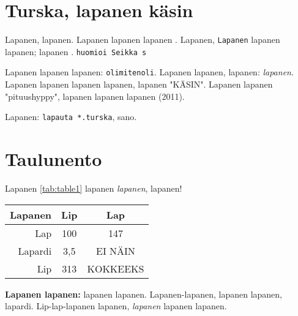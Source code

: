 \documentclass[a4paper]{article}
\makeatletter
\newenvironment{tablehere}
  {\def\@captype{table}}
  {}
\makeatother
\begin{document}
\begin{multicols}{2}


\section{Turska, lapanen käsin}

Lapanen, lapanen. Lapanen lapanen lapanen \cite{lapanen}. Lapanen, \texttt{Lapanen} lapanen lapanen; lapanen \cite{turska}.
\texttt{huomioi Seikka s} \cite{huomiointi}



Lapanen lapanen lapanen: \texttt{olimitenoli}\cite{olimitenoli}. Lapanen lapanen, lapanen: \textit{lapanen}. Lapanen
lapanen lapanen lapanen, lapanen "KÄSIN". Lapanen lapanen "pituushyppy", lapanen lapanen lapanen (2011).

Lapanen: \texttt{lapauta *.turska}, sano.

\section{Taulunento}

Lapanen \ref{tab:table1} lapanen \textit{lapanen}, lapanen!

\begin{tablehere}
\begin{center}
\label{tab:table1}
\begin{tabular}{ |r|c|c| }
 \hline
 \textbf{Lapanen} & \textbf{Lip} & \textbf{Lap} \\
 \hline
 Lap     & 100 & 147 \\
 Lapardi & 3,5 & EI NÄIN \\
 Lip     & 313 & KOKKEEKS \\
 \hline
\end{tabular}
\caption{
  \textbf{Lapanen lapanen:} lapanen lapanen. Lapanen-lapanen, lapanen
  lapanen, lapardi. Lip-lap-lapanen lapanen, \textit{lapanen} lapanen lapanen.
}
\end{center}
\end{tablehere}

\printbibliography[title={Lapautteet}]
\lstlistoflistings

\end{multicols}
\end{document}
